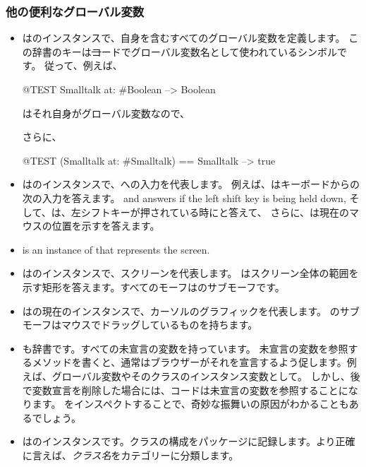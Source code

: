 \documentclass[a4paper,10pt,twoside]{book}
\begin{document}
\subsubsection{他の便利なグローバル変数}

\begin{itemize}
\item
{}はのインスタンスで、自身を含むすべてのグローバル変数を定義します。
この辞書のキーは\st コードでグローバル変数名として使われているシンボルです。
従って、例えば、
\begin{code}{@TEST}
Smalltalk at: #Boolean --> Boolean
\end{code}
はそれ自身がグローバル変数なので、
\begin{code}{}
Smalltalk at: #Smalltalk-->a SystemDictionary(lots of globals)}
\end{code} 
さらに、
\begin{code}{@TEST}
(Smalltalk at: #Smalltalk) == Smalltalk --> true
\end{code}

\item {}はのインスタンスで、\pharo への入力を代表します。
例えば、はキーボードからの次の入力を答えます。
 and  answers  if the left shift key is being held down,
そして、は、左シフトキーが押されている時にと答えて、
さらに、は現在のマウスの位置を示すを答えます。

\item {} is an instance of  that represents the screen.
\item {}はのインスタンスで、スクリーンを代表します。
はスクリーン全体の範囲を示す矩形を答えます。すべてのモーフはのサブモーフです。

\item 
{}はの現在のインスタンスで、カーソルのグラフィックを代表します。
のサブモーフはマウスでドラッグしているものを持ちます。

\item
{}も辞書です。すべての未宣言の変数を持っています。
未宣言の変数を参照するメソッドを書くと、通常はブラウザーがそれを宣言するよう促します。例えば、グローバル変数やそのクラスのインスタンス変数として。
しかし、後で変数宣言を削除した場合には、コードは未宣言の変数を参照することになります。
をインスペクトすることで、奇妙な振舞いの原因がわかることもあるでしょう。

\item
{}はのインスタンスです。クラスの構成をパッケージに記録します。より正確に言えば、\emph{クラス名}をカテゴリーに分類します。
\end{itemize}
\end{document}
